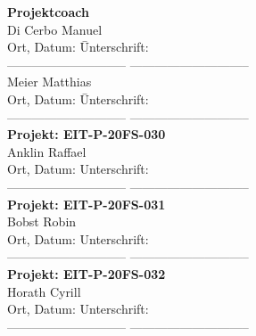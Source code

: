 	\begin{tabbing}
		\textbf{Projektcoach}\\[0.2cm]
		Di Cerbo Manuel\\[0.2cm]
		Ort, Datum: \hspace{5cm}\=Unterschrift:
		\\[0.5cm]----------------------------- \>-----------------------------
		\\[0.2cm]
		Meier Matthias\\[0.2cm]
		Ort, Datum: \hspace{5cm}\=Unterschrift:
		\\[0.5cm]----------------------------- \>-----------------------------
		\\[1cm]
		\textbf{Projekt: EIT-P-20FS-030}\\[0.2cm]
		Anklin Raffael\\[0.2cm]
		Ort, Datum: \>Unterschrift:
		\\[0.5cm]----------------------------- \>-----------------------------
		\\[0.2cm]
		\textbf{Projekt: EIT-P-20FS-031}\\[0.2cm]		
		Bobst Robin\\[0.2cm]
		Ort, Datum: \>Unterschrift:
		\\[0.5cm]----------------------------- \>-----------------------------
		\\[0.2cm]
		\textbf{Projekt: EIT-P-20FS-032}\\[0.2cm]
		Horath Cyrill\\[0.2cm]
		Ort, Datum: \>Unterschrift:
		\\[0.5cm]----------------------------- \>-----------------------------
	\end{tabbing}
	
	\clearpage